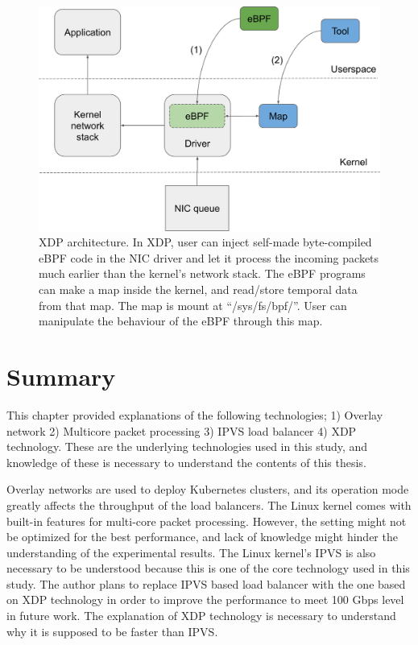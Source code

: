 \begin{figure}[h]
  \centering
  \includegraphics[width=1.0\columnwidth]{Figs/xdp-schem}

  \par\bigskip
  \centering
  \begin{minipage}{0.9\columnwidth}
    \caption[XDP architecture]{
      XDP architecture.
      In XDP, user can inject self-made byte-compiled eBPF code in the NIC driver and let it process the incoming packets much earlier than the kernel's network stack.
      The eBPF programs can make a map inside the kernel, and read/store temporal data from that map.
      The map is mount at \enquote{/sys/fs/bpf/}.
      User can manipulate the behaviour of the eBPF through this map.
    }
    \label{fig:xdp-schem}
  \end{minipage}
\end{figure}

\FloatBarrier

\section{Summary}

This chapter provided explanations of the following technologies; 1) Overlay network 2) Multicore packet processing 3) IPVS load balancer 4) XDP technology.
These are the underlying technologies used in this study, and knowledge of these is necessary to understand the contents of this thesis.

Overlay networks are used to deploy Kubernetes clusters, and its operation mode greatly affects the throughput of the load balancers.
The Linux kernel comes with built-in features for multi-core packet processing.
However, the setting might not be optimized for the best performance, and lack of knowledge might hinder the understanding of the experimental results.
The Linux kernel's IPVS is also necessary to be understood because this is one of the core technology used in this study.
The author plans to replace IPVS based load balancer with the one based on XDP technology in order to improve the performance to meet 100 Gbps level in future work.
The explanation of XDP technology is  necessary to understand why it is supposed to be faster than IPVS.

